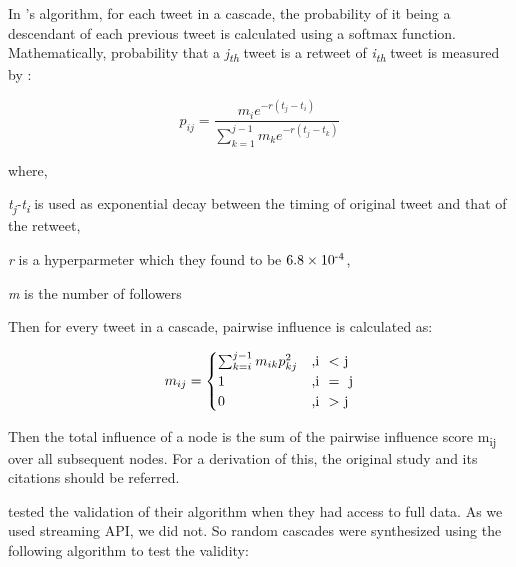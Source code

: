 \documentclass[letterpaper]{article}
\begin{document}
In \cite{rizoiu2018debatenight}'s algorithm, for each tweet in a cascade, the probability of it being a descendant of each previous tweet is calculated using a softmax function. Mathematically, probability that a \textit{j\textsubscript{th}} 
tweet is a retweet of \textit{i\textsubscript{th}} tweet is measured by :\linebreak

\begin{equation*}
    p_{ij}=\frac{{m_{i}e^{-r(t_j-t_i)}}}{\sum_{k=1}^{j-1}m_ke^{-r(t_j-t_k)}}
    \label{eq:probablity}
\end{equation*}

where, \par
\textit{t\textsubscript{j}{-}t\textsubscript{i}} is used as exponential decay between the timing of original tweet and that of the retweet, \par
\textit{r} is a hyperparmeter which they found to be $6.8\times10\textsuperscript{-4}$, \par
\textit{m} is the number of followers \linebreak

Then for every tweet in a cascade, pairwise influence is calculated as:

\begin{equation}
    m_{ij} =
      \begin{cases}
        \sum_{k=i}^{j-1}m_{ik}p_{kj}^2 & \text{,i \ \textless \ j}\\
        1 & \text{,i \ = \ j}\\
        0 & \text{,i \ \textgreater \ j}
      \end{cases}       
    \end{equation}

Then the total influence of a node is the sum of the pairwise influence score m\textsubscript{ij} over all subsequent nodes. For a derivation of this, the original study
 \cite{rizoiu2018debatenight} and its citations should be referred. \par

 \cite{rizoiu2018debatenight} tested the validation of their algorithm when they had access to full data. As we used streaming API, we did not. So random cascades were synthesized using the following algorithm 
 to test the validity:
 
\end{document}
